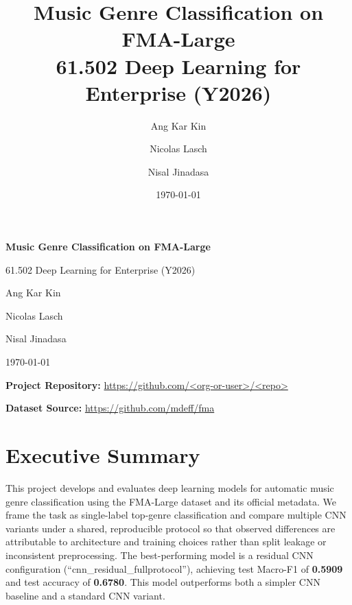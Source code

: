 \documentclass[11pt,a4paper]{article}
\title{Music Genre Classification on FMA-Large\\
\large 61.502 Deep Learning for Enterprise (Y2026)}
\author{
Ang Kar Kin \and
Nicolas Lasch \and
Nisal Jinadasa
}
\date{\today}
\begin{document}
\begin{titlepage}
\thispagestyle{empty}
\vspace*{\fill}
\begin{center}
\vspace*{1em}
{\LARGE \textbf{Music Genre Classification on FMA-Large}\par}
\vspace{0.4em}
{\Large 61.502 Deep Learning for Enterprise (Y2026)\par}
\vspace{1.6em}
{\Large Ang Kar Kin\par}
{\Large Nicolas Lasch\par}
{\Large Nisal Jinadasa\par}
\vspace{1.2em}
{\Large \today\par}
\vspace{2em}
{\Large \textbf{Project Repository:} \url{https://github.com/<org-or-user>/<repo>} \par}
\vspace{0.5em}
{\Large \textbf{Dataset Source:} \url{https://github.com/mdeff/fma} \par}
\end{center}
\vspace*{\fill}
\end{titlepage}
\clearpage

\tableofcontents
\clearpage

\section{Executive Summary}
This project develops and evaluates deep learning models for automatic music genre classification using the FMA-Large dataset and its official metadata. We frame the task as single-label top-genre classification and compare multiple CNN variants under a shared, reproducible protocol so that observed differences are attributable to architecture and training choices rather than split leakage or inconsistent preprocessing. The best-performing model is a residual CNN configuration (``cnn\_residual\_fullprotocol''), achieving test Macro-F1 of \textbf{0.5909} and test accuracy of \textbf{0.6780}. This model outperforms both a simpler CNN baseline and a standard CNN variant.
\end{document}
